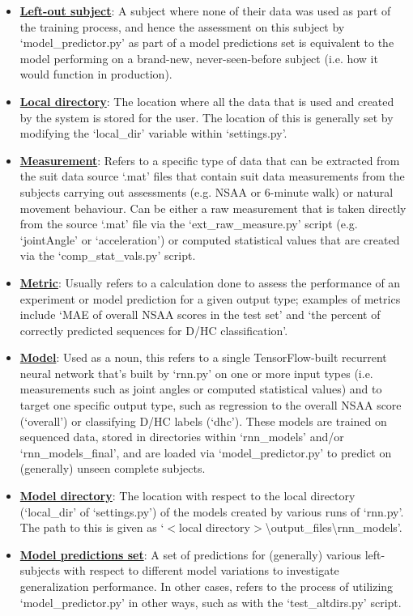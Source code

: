 \documentclass[12pt,twoside]{report}
\begin{document}
\begin{itemize}
	\item \underline{\textbf{Left-out subject}}: A subject where none of their data was used as part of the training process, and hence the assessment on this subject by ‘model\_predictor.py’ as part of a model predictions set is equivalent to the model performing on a brand-new, never-seen-before subject (i.e. how it would function in production).
	\item \underline{\textbf{Local directory}}: The location where all the data that is used and created by the system is stored for the user. The location of this is generally set by modifying the ‘local\_dir’ variable within ‘settings.py’.
	\item \underline{\textbf{Measurement}}: Refers to a specific type of data that can be extracted from the suit data source ‘.mat’ files that contain suit data measurements from the subjects carrying out assessments (e.g. NSAA or 6-minute walk) or natural movement behaviour. Can be either a raw measurement that is taken directly from the source ‘.mat’ file via the ‘ext\_raw\_measure.py’ script (e.g. ‘jointAngle’ or ‘acceleration’) or computed statistical values that are created via the ‘comp\_stat\_vals.py’ script.
	\item \underline{\textbf{Metric}}: Usually refers to a calculation done to assess the performance of an experiment or model prediction for a given output type; examples of metrics include ‘MAE of overall NSAA scores in the test set’ and ‘the percent of correctly predicted sequences for D/HC classification’.
	\item \underline{\textbf{Model}}: Used as a noun, this refers to a single TensorFlow-built recurrent neural network that’s built by ‘rnn.py’ on one or more input types (i.e. measurements such as joint angles or computed statistical values) and to target one specific output type, such as regression to the overall NSAA score (‘overall’) or classifying D/HC labels (‘dhc’). These models are trained on sequenced data, stored in directories within ‘rnn\_models’ and/or ‘rnn\_models\_final’, and are loaded via ‘model\_predictor.py’ to predict on (generally) unseen complete subjects.
	\item \underline{\textbf{Model directory}}: The location with respect to the local directory (‘local\_dir’ of ‘settings.py’) of the models created by various runs of ‘rnn.py’. The path to this is given as ‘$<$local directory$>$\textbackslash output\_files\textbackslash rnn\_models’.
	\item \underline{\textbf{Model predictions set}}: A set of predictions for (generally) various left-subjects with respect to different model variations to investigate generalization performance. In other cases, refers to the process of utilizing ‘model\_predictor.py’ in other ways, such as with the ‘test\_altdirs.py’ script.

\end{itemize}
\end{document}
